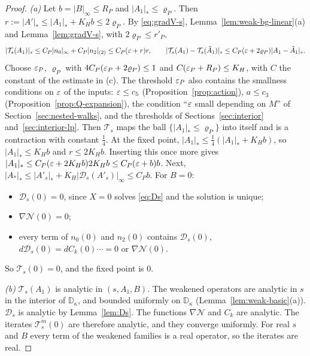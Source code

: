 \begin{proof}
\emph{(a)} Let $b=|B|_\infty\le R_P$ and $|A_1|_*\le\varrho_P$. Then $r:=|A'|_*\le|A_1|_*+K_Hb\le2\varrho_P$. By \eqref{eq:gradV-s}, Lemma~\ref{lem:weak-bg-linear}(a) and Lemma~\ref{lem:gradV-s}, with $2\varrho_P\le r'_P$,
\[
|\mathcal T_s(A_1)|_*\le C_P|n_0|_\infty+C_P|n_2|_{(2)}\le C_P(\varepsilon+r)r,\qquad|\mathcal T_s(A_1)-\mathcal T_s(\tilde A_1)|_*\le C_P(\varepsilon+2\varrho_P)|A_1-\tilde A_1|_* .
\]
Choose $\varepsilon_P$, $\varrho_P$ with $4C_P(\varepsilon_P+2\varrho_P)\le1$ and $C(\varepsilon_P+R_P)\le K_H$, with $C$ the constant of the estimate in (c). The threshold $\varepsilon_P$ also contains the smallness conditions on $\varepsilon$ of the inputs: $\varepsilon\le c_5$ (Proposition~\ref{prop:action}), $a\le c_3$ (Proposition~\ref{prop:Q-expansion}), the condition ``$\varepsilon$ small depending on $M$'' of Section~\ref{sec:nested-walks}, and the thresholds of Sections~\ref{sec:interior} and~\ref{sec:interior-lp}. Then $\mathcal T_s$ maps the ball $\{|A_1|_*\le\varrho_P\}$ into itself and is a contraction with constant $\frac14$. At the fixed point, $|A_1|_*\le\frac14(|A_1|_*+K_Hb)$, so $|A_1|_*\le K_Hb$ and $r\le2K_Hb$. Inserting this once more gives $|A_1|_*\le C_P(\varepsilon+2K_Hb)2K_Hb\le C_P(\varepsilon+b)b$. Next, $|A_*|_*\le|A'_s|_*+K_H|\mathcal D_s(A'_s)|_\infty\le C_Pb$. For $B=0$:
\begin{itemize}
\item $\mathcal D_s(0)=0$, since $X=0$ solves \eqref{eq:Ds} and the solution is unique;
\item $\nabla\mathcal N(0)=0$;
\item every term of $n_0(0)$ and $n_2(0)$ contains $\mathcal D_s(0)$, $d\mathcal D_s(0)=dC_k(0)\cdots=0$ or $\nabla\mathcal N(0)$.
\end{itemize}
So $\mathcal T_s(0)=0$, and the fixed point is $0$.

\emph{(b)} $\mathcal T_s(A_1)$ is analytic in $(s,A_1,B)$. The weakened operators are analytic in $s$ in the interior of $\mathbb D_\kappa$, and bounded uniformly on $\mathbb D_\kappa$ (Lemma~\ref{lem:weak-basic}(a)). $\mathcal D_s$ is analytic by Lemma~\ref{lem:Ds}. The functions $\nabla\mathcal N$ and $C_k$ are analytic. The iterates $\mathcal T_s^m(0)$ are therefore analytic, and they converge uniformly. For real $s$ and $B$ every term of the weakened families is a real operator, so the iterates are real.


\end{proof}
